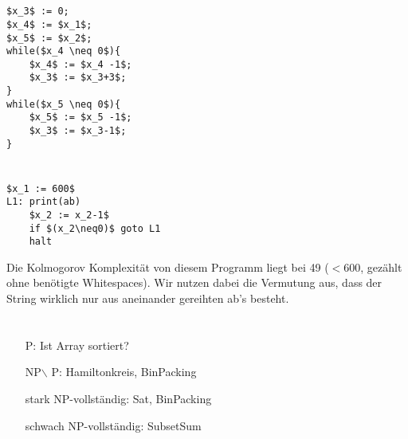 \documentclass{article}
\begin{document}
\section{}

\section{}
\begin{lstlisting}[mathescape]
$x_3$ := 0;
$x_4$ := $x_1$;
$x_5$ := $x_2$;
while($x_4 \neq 0$){
    $x_4$ := $x_4 -1$;
    $x_3$ := $x_3+3$;
}
while($x_5 \neq 0$){
    $x_5$ := $x_5 -1$;
    $x_3$ := $x_3-1$;
}
\end{lstlisting}

\section{}
\begin{lstlisting}[mathescape]
    $x_1 := 600$
L1: print(ab)
    $x_2 := x_2-1$
    if $(x_2\neq0)$ goto L1
    halt
\end{lstlisting}
Die Kolmogorov Komplexität von diesem Programm liegt bei 49 ($<600$, gezählt ohne benötigte Whitespaces). Wir nutzen dabei die Vermutung aus, dass der String wirklich nur aus aneinander gereihten ab's besteht.

\section{}
\begin{enumerate}
  \item[P:] Ist Array sortiert?
  \item[NP$\backslash$ P:] Hamiltonkreis, BinPacking
  \item[stark NP-vollständig:] Sat, BinPacking
  \item[schwach NP-vollständig:] SubsetSum
\end{enumerate}
\end{document}
